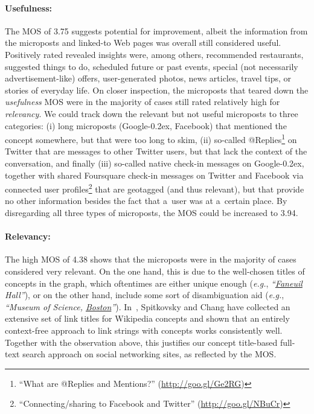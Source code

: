 \documentclass[runningheads,a4paper]{llncs}
\newcommand{\googleplus}{Google\nolinebreak\hspace{0em}\raisebox{.28ex}{\tiny\bf +}\kern-0.2ex\xspace}
\begin{document}
\paragraph{Usefulness:}
The MOS of 3.75 suggests potential for improvement,
albeit the information from the microposts and linked-to Web pages
was overall still considered useful.
Positively rated revealed insights were, among others, recommended restaurants,
suggested things to do, scheduled future or past events,
special (not necessarily advertisement-like) offers, user-generated photos,
news articles, travel tips, or stories of everyday life.
On closer inspection, the microposts that teared down the \emph{usefulness} MOS
were in the majority of cases still rated relatively high for \emph{relevancy}.
We could track down the relevant but not useful microposts to three categories:
(i) long microposts (\googleplus, Facebook) that mentioned the concept somewhere,
but that were too long to skim,
(ii) so-called
@Replies\footnote{``What are @Replies and Mentions?'' (\url{http://goo.gl/Ge2RG})}
on Twitter that are messages to other Twitter users,
but that lack the context of the conversation, and finally
(iii) so-called native check-in messages on \googleplus,
together with shared Foursquare check-in messages on Twitter and Facebook
via connected user profiles\footnote{``Connecting/sharing to Facebook and Twitter'' (\url{http://goo.gl/NBuCr})}
that are geotagged (and thus relevant),
but that provide no other information besides the fact
that a~user was at a~certain place.
By disregarding all three types of microposts, the MOS could be increased to 3.94.

\vspace{-0.7em}
\paragraph{Relevancy:} \label{sec:relevancy}
The high MOS of 4.38 shows that the microposts
were in the majority of cases considered very relevant.
On the one hand, this is due to the well-chosen titles of concepts in the graph,
which oftentimes are either unique enough (\emph{e.g.}, \emph{``\underline{Faneuil} Hall''}),
or on the other hand, include some sort of disambiguation aid
(\emph{e.g.}, \emph{``Museum of Science, \underline{Boston}''}).
In~\cite{spitkovsky2012}, Spitkovsky and Chang have collected
an extensive set of link titles for Wikipedia concepts
and shown that an entirely context-free approach
to link strings with concepts works consistently well.
Together with the observation above, this justifies
our concept title-based full-text search approach on social networking sites,
as reflected by the MOS.
\end{document}

